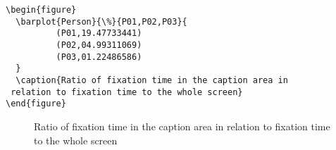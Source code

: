 \begin{verbatim}
\begin{figure} 
  \barplot{Person}{\%}{P01,P02,P03}{
	      (P01,19.47733441) 
	      (P02,04.99311069) 
	      (P03,01.22486586)
  }
  \caption{Ratio of fixation time in the caption area in
 relation to fixation time to the whole screen}
\end{figure}
\end{verbatim}

\begin{figure} 
  \caption{Ratio of fixation time in the caption area in relation to fixation time to the whole screen}
  \label{fig:barplot}
\end{figure}

 

